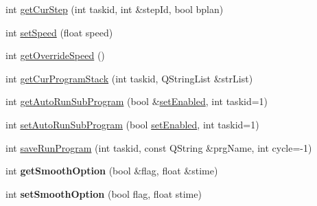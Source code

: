 \begin{DoxyCompactItemize}
int \hyperlink{classCUIApp_aa438386c549ffd19a09b202ba1c406d6}{get\-Cur\-Step} (int taskid, int \&step\-Id, bool bplan)
\item 
int \hyperlink{classCUIApp_a5260cf4599017e2da6c99295dd6b9558}{set\-Speed} (float speed)
\item 
int \hyperlink{classCUIApp_a916a3ae9eea10c497d29b1ffc0a0af1a}{get\-Override\-Speed} ()
\item 
int \hyperlink{classCUIApp_a40a04b9026dff73dac5f426700205fdc}{get\-Cur\-Program\-Stack} (int taskid, Q\-String\-List \&str\-List)
\item 
int \hyperlink{classCUIApp_af3f0a39e3dacc4ab67611e527f91a53a}{get\-Auto\-Run\-Sub\-Program} (bool \&\hyperlink{classCUIApp_a0bb9aaecc950f991d3ecc69e5895e9e6}{set\-Enabled}, int taskid=1)
\item 
int \hyperlink{classCUIApp_a7ec5fc0b595cc0744216a3ea157db1e3}{set\-Auto\-Run\-Sub\-Program} (bool \hyperlink{classCUIApp_a0bb9aaecc950f991d3ecc69e5895e9e6}{set\-Enabled}, int taskid=1)
\item 
int \hyperlink{classCUIApp_a400be7d1d827f7a7db158f84a50b65ff}{save\-Run\-Program} (int taskid, const Q\-String \&prg\-Name, int cycle=-\/1)
\item 
\hypertarget{classCUIApp_acd8d8dbf0fe2c532e8e96f2631bcd0ca}{int {\bfseries get\-Smooth\-Option} (bool \&flag, float \&stime)}\label{classCUIApp_acd8d8dbf0fe2c532e8e96f2631bcd0ca}

\item 
\hypertarget{classCUIApp_abbed0c4ecd83767c1829fea519b29cf7}{int {\bfseries set\-Smooth\-Option} (bool flag, float stime)}\label{classCUIApp_abbed0c4ecd83767c1829fea519b29cf7}


\end{DoxyCompactItemize}
